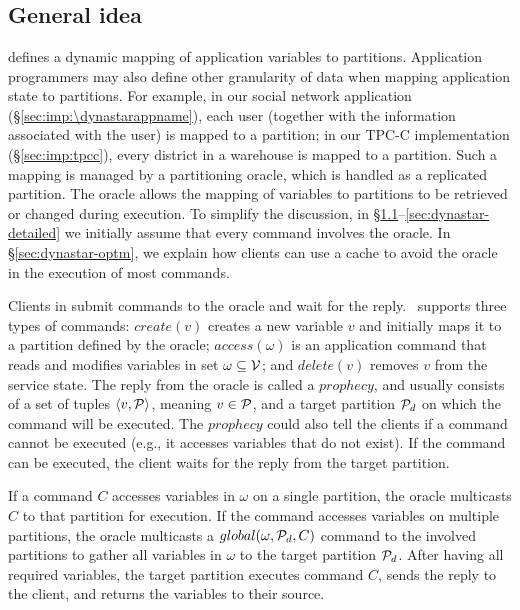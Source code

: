\section{\dynastar}
\subsection{General idea}
\label{sec:dynastar-idea}

\dynastar defines a dynamic mapping of application variables to partitions.
Application programmers may also define other granularity of data when mapping
application state to partitions. For example, in our social network application
(\S\ref{sec:imp:\dynastarappname}), each user (together with the information associated
with the user) is mapped to a partition; in our TPC-C implementation
(\S\ref{sec:imp:tpcc}), every district in a warehouse is mapped to a partition.
Such a mapping is managed by a partitioning oracle, which is handled as a
replicated partition. The oracle allows the mapping of variables to partitions
to be retrieved or changed during execution. To simplify the discussion, in
\S\ref{sec:dynastar-idea}--\ref{sec:dynastar-detailed} we initially assume
that every command involves the oracle. In \S\ref{sec:dynastar-optm}, we explain how
clients can use a cache to avoid the oracle in the execution of most commands.

Clients in \dynastar submit commands to the oracle and wait for the reply.
\dynastar\ supports three types of commands: $create(v)$ creates a new variable
$v$ and initially maps it to a partition defined by the oracle; $access(\omega)$
is an application command that reads and modifies variables in set $\omega
\subseteq \mathcal{V}$; and $delete(v)$ removes $v$ from the service state. The reply
from the oracle is called a $prophecy$, and usually consists of a set of tuples
$\langle v, \mathcal{P} \rangle$, meaning $v \in \mathcal{P}$, and a target partition $\mathcal{P}_d$
on which the command will be executed. The $prophecy$ could also tell the
clients if a command cannot be executed (e.g., it accesses variables that do not
exist). If the command can be executed, the client waits for the reply from the
target partition.

If a command $C$ accesses variables in $\omega$ on a single partition, the
oracle multicasts $C$ to that partition for execution. If the command accesses
variables on multiple partitions, the oracle multicasts a $global(\omega,\mathcal{P}_d,
C)$ command to the involved partitions to gather all variables in $\omega$ to
the target partition $\mathcal{P}_d$. After having all required variables, the target
partition executes command $C$, sends the reply to the client, and returns the
variables to their source.


